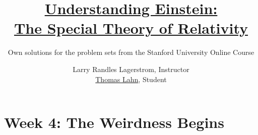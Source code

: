 \documentclass[pagesize,headsepline,10pt,parskip=half]{scrreprt}
\begin{document}

  \begin{titlepage}
    \title{\href{https://www.coursera.org/learn/einstein-relativity/}{Understanding Einstein:\\The Special Theory of Relativity}}
    \subtitle{Own solutions for the problem sets from the Stanford University Online Course}
    \author{Larry Randles Lagerstrom, Instructor\\\href{http://PointedEars.de/}{Thomas Lahn}, Student}
    \maketitle
  \end{titlepage}

  \clearpage
  \begin{spacing}{1}
    \tableofcontents
    \thispagestyle{empty}
  \end{spacing}


  \clearpage
  \chapter{Week 4: The Weirdness Begins}
\end{document}
